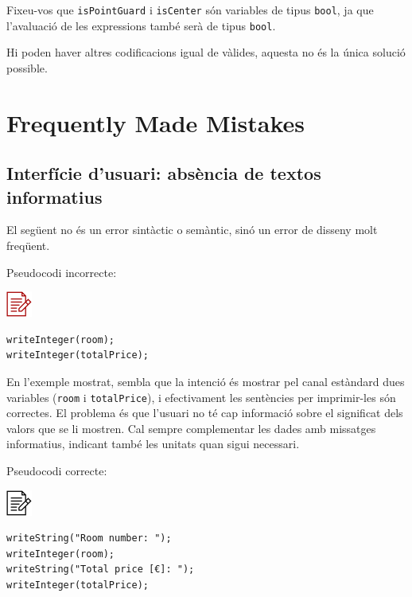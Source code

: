 \documentclass[
]{book}
\begin{document}
Fixeu-vos que \texttt{isPointGuard} i \texttt{isCenter} són variables de tipus \texttt{bool}, ja que l'avaluació de les expressions també serà de tipus \texttt{bool}.

Hi poden haver altres codificacions igual de vàlides, aquesta no és la única solució possible.

\hypertarget{frequently-made-mistakes-1}{%
\section{Frequently Made Mistakes}\label{frequently-made-mistakes-1}}

\hypertarget{interfuxedcie-dusuari-absuxe8ncia-de-textos-informatius}{%
\subsection{Interfície d'usuari: absència de textos informatius}\label{interfuxedcie-dusuari-absuxe8ncia-de-textos-informatius}}

El següent no és un error sintàctic o semàntic, sinó un error de disseny molt freqüent.

Pseudocodi incorrecte:

\includegraphics{./img/alg_err.png}

\begin{verbatim}
writeInteger(room);
writeInteger(totalPrice);
\end{verbatim}

En l'exemple mostrat, sembla que la intenció és mostrar pel canal estàndard dues variables (\texttt{room} i \texttt{totalPrice}), i efectivament les sentències per imprimir-les són correctes. El problema és que l'usuari no té cap informació sobre el significat dels valors que se li mostren. Cal sempre complementar les dades amb missatges informatius, indicant també les unitats quan sigui necessari.

Pseudocodi correcte:

\includegraphics{./img/alg.png}

\begin{verbatim}
writeString("Room number: ");
writeInteger(room);
writeString("Total price [€]: ");
writeInteger(totalPrice);
\end{verbatim}
\end{document}
